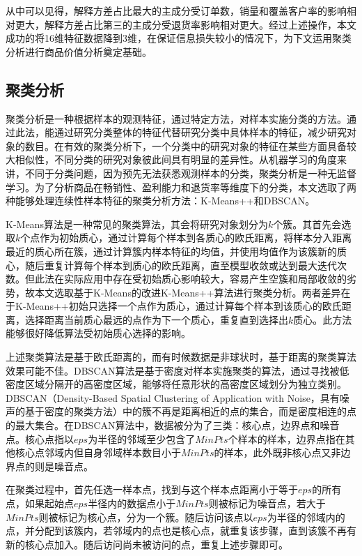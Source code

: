 \documentclass[lang=cn,11pt,a4paper,cite=authoryear]{elegantpaper}
\begin{document}
从中可以见得，解释方差占比最大的主成分受订单数，销量和覆盖客户率的影响相对更大，解释方差占比第三的主成分受退货率影响相对更大。经过上述操作，本文成功的将16维特征数据降到3维，在保证信息损失较小的情况下，为下文运用聚类分析进行商品价值分析奠定基础。

\subsection{聚类分析}
聚类分析是一种根据样本的观测特征，通过特定方法，对样本实施分类的方法。通过此法，能通过研究分类整体的特征代替研究分类中具体样本的特征，减少研究对象的数目。在有效的聚类分析下，一个分类中的研究对象的特征在某些方面具备较大相似性，不同分类的研究对象彼此间具有明显的差异性。从机器学习的角度来讲，不同于分类问题，因为预先无法获悉观测样本的分类，聚类分析是一种无监督学习。为了分析商品在畅销性、盈利能力和退货率等维度下的分类，本文选取了两种能够处理连续性样本特征的聚类分析方法：K-Means++和DBSCAN。

K-Means算法是一种常见的聚类算法，其会将研究对象划分为$k$个簇。其首先会选取$k$个点作为初始质心，通过计算每个样本到各质心的欧氏距离，将样本分入距离最近的质心所在簇，通过计算簇内样本特征的均值，并使用均值作为该簇新的质心，随后重复计算每个样本到质心的欧氏距离，直至模型收敛或达到最大迭代次数。但此法在实际应用中存在受初始质心影响较大，容易产生空簇和局部收敛的劣势，故本文选取基于K-Means的改进K-Means++算法进行聚类分析。两者差异在于K-Means++初始只选择一个点作为质心，通过计算每个样本到该质心的欧氏距离，选择距离当前质心最远的点作为下一个质心，重复直到选择出$k$质心。此方法能够很好降低算法受初始质心选择的影响。

上述聚类算法是基于欧氏距离的，而有时候数据是非球状时，基于距离的聚类算法效果可能不佳。DBSCAN算法是基于密度对样本实施聚类的算法，通过寻找被低密度区域分隔开的高密度区域，能够将任意形状的高密度区域划分为独立类别。DBSCAN（Density-Based Spatial Clustering of Application with Noise，具有噪声的基于密度的聚类方法）中的簇不再是距离相近的点的集合，而是密度相连的点的最大集合。在DBSCAN算法中，数据被分为了三类：核心点，边界点和噪音点。核心点指以$eps$为半径的邻域至少包含了$MinPts$个样本的样本，边界点指在其他核心点邻域内但自身邻域样本数目小于$MinPts$的样本，此外既非核心点又非边界点的则是噪音点。

在聚类过程中，首先任选一样本点，找到与这个样本点距离小于等于$eps$的所有点，如果起始点$eps$半径内的数据点小于$MinPts$则被标记为噪音点，若大于$MinPts$则被标记为核心点，分为一个簇。随后访问该点以$eps$为半径的邻域内的点，并分配到该簇内，若邻域内的点也是核心点，就重复该步骤，直到该簇不再有新的核心点加入。随后访问尚未被访问的点，重复上述步骤即可。
\end{document}
